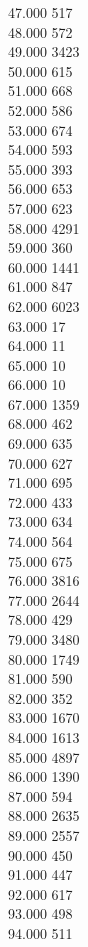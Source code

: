 { 47.000	517 \\
 48.000	572 \\
 49.000	3423 \\
 50.000	615 \\
 51.000	668 \\
 52.000	586 \\
 53.000	674 \\
 54.000	593 \\
 55.000	393 \\
 56.000	653 \\
 57.000	623 \\
 58.000	4291 \\
 59.000	360 \\
 60.000	1441 \\
 61.000	847 \\
 62.000	6023 \\
 63.000	17 \\
 64.000	11 \\
 65.000	10 \\
 66.000	10 \\
 67.000	1359 \\
 68.000	462 \\
 69.000	635 \\
 70.000	627 \\
 71.000	695 \\
 72.000	433 \\
 73.000	634 \\
 74.000	564 \\
 75.000	675 \\
 76.000	3816 \\
 77.000	2644 \\
 78.000	429 \\
 79.000	3480 \\
 80.000	1749 \\
 81.000	590 \\
 82.000	352 \\
 83.000	1670 \\
 84.000	1613 \\
 85.000	4897 \\
 86.000	1390 \\
 87.000	594 \\
 88.000	2635 \\
 89.000	2557 \\
 90.000	450 \\
 91.000	447 \\
 92.000	617 \\
 93.000	498 \\
 94.000	511 \\
}
